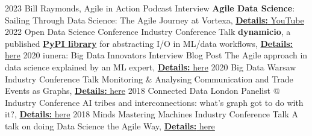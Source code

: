 \documentclass[]{../../friggeri-cv}
\begin{document}
\begin{entrylist2}
    \entrytwo
        {\small 2023}
        {\small Bill Raymonds, Agile in Action}
        {\small Podcast Interview}
        {\small \textbf{Agile Data Science}: Sailing Through Data Science: The Agile Journey at Vortexa, \underline{\textbf{Details:} \href{https://christos-hadjinikolis.github.io//2023/10/31/Agile-In-Action.html}{YouTube}}}
    \entrytwo
        {\small 2022}
        {\small Open Data Science Conference}
        {\small Industry Conference Talk}
        {\small \textbf{dynamicio}, a published \href{https://pypi.org/project/dynamicio/}{\textbf{PyPI library}} for abstracting I/O in ML/data workflows, \underline{\textbf{Details:} \href{https://odsc.com/speakers/dynamicio-a-pandas-i-o-wrapper-why-you-should-start-your-ml-ops-journey-with-wrapping-your-i-o/}{here}}}
    \entrytwo
        {\small 2020}
        {\small iunera: Big Data Innovators}
        {\small Interview Blog Post}
        {\small The Agile approach in data science explained by an ML expert, \underline{\textbf{Details:} \href{https://www.iunera.com/kraken/interviews/the-agile-approach-in-data-science-explained-by-an-ml-expert/}{here}}}
    \entrytwo
        {\small 2020}
        {\small Big Data Warsaw}
        {\small Industry Conference Talk}
        {\small Monitoring \& Analysing Communication and Trade Events as Graphs, \underline{\textbf{Details:} \href{https://bigdatatechwarsaw.eu/agenda/}{here}}}
    \entrytwo
        {\small 2018}
        {\small Connected Data London}
        {\small Panelist @ Industry Conference}
        {\small AI tribes and interconnections: what's graph got to do with it?, \underline{\textbf{Details:} \href{http://connected-data.london/2018/09/23/ai-tribes-and-interconnections-whats-graph-got-to-do-with-it/}{here}}}
    \entrytwo
        {\small 2018}
        {\small Minds Mastering Machines}
        {\small Industry Conference Talk}
        {\small A talk on doing Data Science the Agile Way, \underline{\textbf{Details:} \href{https://2018.mcubed.london/sessions/data-science-agile-way/}{here}}}
\end{entrylist2}
\end{document}
